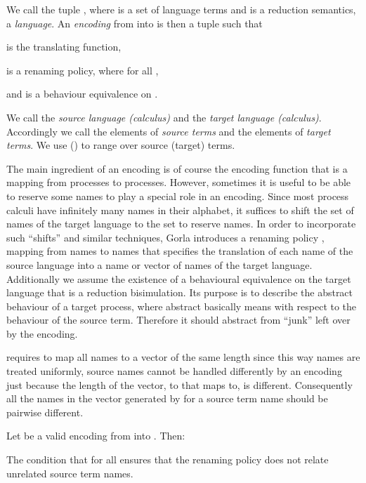 \documentclass[]{article}
\begin{document}
We call the tuple , where  is a set of language terms and  is a reduction semantics, a \emph{language}.
An \emph{encoding} from  into  is then a tuple  such that
\begin{compactitem}
	\item  is the translating function,
	\item  is a renaming policy, where  for all ,
	\item and  is a behaviour equivalence on .
\end{compactitem}
We call  the \emph{source language (calculus)} and  the \emph{target language (calculus)}. Accordingly we call the elements of  \emph{source terms} and the elements of  \emph{target terms}.
We use  () to range over source (target) terms.

The main ingredient of an encoding is of course the encoding function  that is a mapping from processes to processes.
However, sometimes it is useful to be able to reserve some names to play a special role in an encoding.
Since most process calculi have infinitely many names in their alphabet, it suffices to shift the set of names  of the target language to the set  to reserve  names. In order to incorporate such ``shifts'' and similar techniques, Gorla introduces a renaming policy , \ie mapping from names to names that specifies the translation of each name of the source language into a name or vector of names of the target language.
Additionally we assume the existence of a behavioural equivalence  on the target language that is a reduction bisimulation. Its purpose is to describe the abstract behaviour of a target process, where abstract basically means with respect to the behaviour of the source term. Therefore it should abstract from ``junk'' left over by the encoding.

\cite{gorla} requires  to map all names to a vector of the same length since this way names are treated uniformly, \ie source names cannot be handled differently by an encoding just because the length of the vector, to that  maps to, is different.
Consequently all the names in the vector generated by  for a source term name should be pairwise different.

\begin{obs}
	\label{obs:renamingPolicyVector}
	Let \encod be a valid encoding from \piT into \piNM. Then:
	
\end{obs}

The condition that  for all  ensures that the renaming policy does not relate unrelated source term names.
\end{document}
